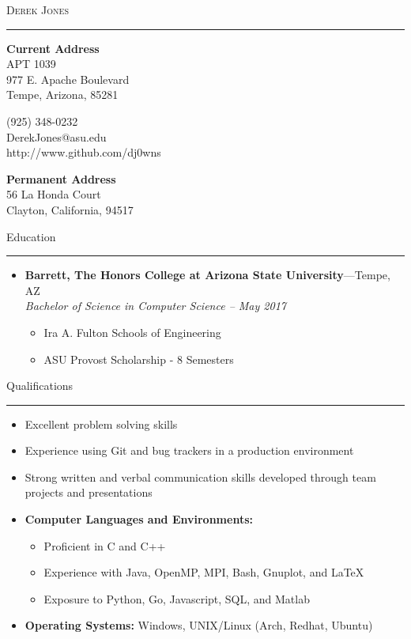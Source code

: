 \documentclass[10pt,oneside]{article}
\makeatletter
\newcommand{\name}{Derek Jones}
\newcommand{\homeaddrtop}{56 La Honda Court}
\newcommand{\homeaddrbot}{Clayton, California, 94517}
\newcommand{\schooladdrtop}{APT 1039}
\newcommand{\schooladdrmid}{977 E. Apache Boulevard}
\newcommand{\schooladdrbot}{Tempe, Arizona, 85281}
\newcommand{\cellphone}{(925) 348-0232}
\newcommand{\email}{DerekJones@asu.edu}
\newcommand{\github}{http://www.github.com/dj0wns}
\newcommand{\bigname}[1]{
	\begin{center}\huge\scshape#1\end{center}
}
\newcommand{\sectitle}[1]{
	\begin{flushleft}{\fontfamily{phv}\selectfont\Large#1}\end{flushleft}
}
\newenvironment{ressection}[1]{
	\vspace{2pt}
	\sectitle{#1}
	\vspace{-10pt}\rule{\textwidth}{0.5pt}
	\vspace{-10pt}
	\begin{itemize}
	\vspace{3pt}
}{
	\end{itemize}
}
\newcommand{\resitem}[1]{
	\vspace{-4pt}
	\item \begin{flushleft} #1 \end{flushleft}
}
\newcommand{\ressubitem}[1]{
	\vspace{-1pt}
	\item \begin{flushleft} #1 \end{flushleft}
}
\newcommand{\resbigitem}[3]{
	\vspace{-5pt}
	\item
	\textbf{#1}---#2 \\
	\textit{#3}
}
\newenvironment{ressubsec}[3]{
	\resbigitem{#1}{#2}{#3}
	\vspace{-4pt}
	\begin{itemize}
}{
	\end{itemize}
}
\newenvironment{reslist}[1]{
	\resitem{\textbf{#1}}
	\vspace{-5pt}
	\begin{itemize}
}{
	\end{itemize}
}
\makeatother
\begin{document}
 \selectfont

\bigname{\name}
\vspace{-6pt} \rule{\textwidth}{1pt}
\vspace{-22pt}
\begin{multicols}{3}
	
	{\bfseries Current Address}\\
	\schooladdrtop \\
	\schooladdrmid \\
	\schooladdrbot \\
	
	\columnbreak
	\begin{center}
		\cellphone \\
		\email\\
		\github\\
	\end{center}
	
	\columnbreak
	\begin{flushright}
	{\bfseries Permanent Address}\\
	\homeaddrtop\\
	\homeaddrbot\\
	\end{flushright}

\end{multicols}

\vspace{-24 pt}




\vspace{\baselineskip}
\begin{ressection}{Education}
	\begin{ressubsec}{Barrett, The Honors College at Arizona State University}{Tempe, AZ}{Bachelor of Science in Computer Science -- May 2017}
		\ressubitem{Ira A. Fulton Schools of Engineering}
		\ressubitem{ASU Provost Scholarship - 8 Semesters}
	\end{ressubsec}
\end{ressection}


\begin{ressection}{Qualifications}
	\resitem{Excellent problem solving skills}

	\resitem{Experience using Git and bug trackers in a production environment}

	\resitem{Strong written and verbal communication skills developed through team projects and presentations}

	\begin{reslist}{Computer Languages and Environments:}
		\ressubitem{Proficient in C and C++}
		\ressubitem{Experience with Java, OpenMP, MPI, Bash, Gnuplot, and LaTeX}
		\ressubitem{Exposure to Python, Go, Javascript, SQL, and Matlab}
	\end{reslist}

	\resitem{\textbf{Operating Systems:} Windows,
	UNIX/Linux (Arch, Redhat, Ubuntu)}

\end{ressection}
\end{document}
